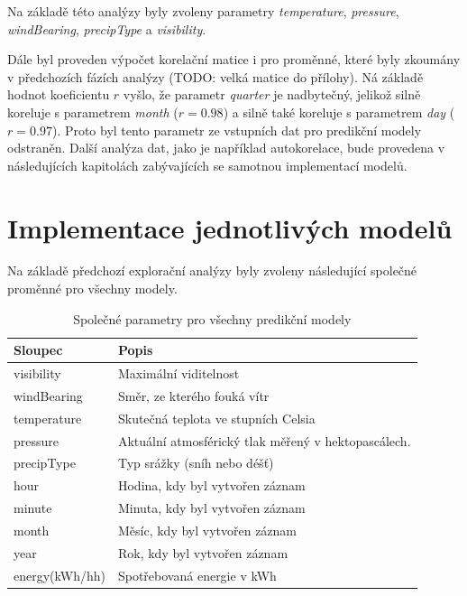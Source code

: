 \documentclass[FM,BP,fonts]{tulthesis}
\begin{document}
Na základě této analýzy byly zvoleny parametry \textit{temperature}, \textit{pressure}, \textit{windBearing}, \textit{precipType} a \textit{visibility}.

Dále byl proveden výpočet korelační matice i pro proměnné, které byly zkoumány v předchozích fázích analýzy (TODO: velká matice do přílohy). Ná základě hodnot koeficientu $r$ vyšlo, že parametr \textit{quarter} je nadbytečný, jelikož silně koreluje s parametrem \textit{month} ($r=0.98$) a silně také koreluje s parametrem \textit{day} ($r=0.97$). Proto byl tento parametr ze vstupních dat pro predikční modely odstraněn. Další analýza dat, jako je například autokorelace, bude provedena v následujících kapitolách zabývajících se samotnou implementací modelů.


\newpage

\section{Implementace jednotlivých modelů}

Na základě předchozí explorační analýzy byly zvoleny následující společné proměnné pro všechny modely. 

\begin{table}[!ht]
	\centering
	\caption{Společné parametry pro všechny predikční modely}
	\label{weather_dataset}
	\begin{tabularx}{\linewidth}{lX}
		\hline
		\textbf{Sloupec} & \textbf{Popis} \\ \hline
		visibility & Maximální viditelnost \\ 
		windBearing & Směr, ze kterého fouká vítr \\ 
		temperature & Skutečná teplota ve stupních Celsia \\ 
		pressure & Aktuální atmosférický tlak měřený v hektopascálech. \\ 
		precipType & Typ srážky (sníh nebo déšť) \\
		hour & Hodina, kdy byl vytvořen záznam \\
		minute & Minuta, kdy byl vytvořen záznam \\
		month & Měsíc, kdy byl vytvořen záznam \\
		year & Rok, kdy byl vytvořen záznam \\
		energy(kWh/hh) & Spotřebovaná energie v kWh \\
		\hline
	\end{tabularx}
\end{table}
\end{document}
